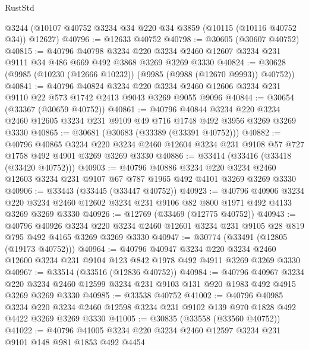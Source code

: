 \begin{lexlean}{RustStd}
\begin{coremodule}
    @3244
    (@10107 @40752 @3234 @34 @220 @34 @3859 (@10115 (@10116 @40752 @34)) @12627)
@40796 := @12633 @40752
@40798 := @30605 (@30607 @40752)
@40815 := @40796
    @40798
    @3234
    @220
    @3234
    @2460
    @12607
    @3234
    @231
    @9111
    @34
    @486
    @669
    @492
    @3868
    @3269
    @3269
    @3330
@40824 := @30628 (@9985 (@10230 (@12666 @10232)) (@9985 (@9988 (@12670 @9993)) @40752))
@40841 := @40796
    @40824
    @3234
    @220
    @3234
    @2460
    @12606
    @3234
    @231
    @9110
    @22
    @573
    @1742
    @2413
    @9043
    @3269
    @9055
    @9096
@40844 := @30654 (@33367 (@30659 @40752))
@40861 := @40796
    @40844
    @3234
    @220
    @3234
    @2460
    @12605
    @3234
    @231
    @9109
    @49
    @716
    @1748
    @492
    @3956
    @3269
    @3269
    @3330
@40865 := @30681 (@30683 (@33389 (@33391 @40752)))
@40882 := @40796
    @40865
    @3234
    @220
    @3234
    @2460
    @12604
    @3234
    @231
    @9108
    @57
    @727
    @1758
    @492
    @4901
    @3269
    @3269
    @3330
@40886 := @33414 (@33416 (@33418 (@33420 @40752)))
@40903 := @40796
    @40886
    @3234
    @220
    @3234
    @2460
    @12603
    @3234
    @231
    @9107
    @67
    @787
    @1965
    @492
    @4101
    @3269
    @3269
    @3330
@40906 := @33443 (@33445 (@33447 @40752))
@40923 := @40796
    @40906
    @3234
    @220
    @3234
    @2460
    @12602
    @3234
    @231
    @9106
    @82
    @800
    @1971
    @492
    @4133
    @3269
    @3269
    @3330
@40926 := @12769 (@33469 (@12775 @40752))
@40943 := @40796
    @40926
    @3234
    @220
    @3234
    @2460
    @12601
    @3234
    @231
    @9105
    @28
    @819
    @795
    @492
    @4165
    @3269
    @3269
    @3330
@40947 := @30774 (@33491 (@12805 (@19173 @40752)))
@40964 := @40796
    @40947
    @3234
    @220
    @3234
    @2460
    @12600
    @3234
    @231
    @9104
    @123
    @842
    @1978
    @492
    @4911
    @3269
    @3269
    @3330
@40967 := @33514 (@33516 (@12836 @40752))
@40984 := @40796
    @40967
    @3234
    @220
    @3234
    @2460
    @12599
    @3234
    @231
    @9103
    @131
    @920
    @1983
    @492
    @4915
    @3269
    @3269
    @3330
@40985 := @33538 @40752
@41002 := @40796
    @40985
    @3234
    @220
    @3234
    @2460
    @12598
    @3234
    @231
    @9102
    @139
    @970
    @1828
    @492
    @4422
    @3269
    @3269
    @3330
@41005 := @30835 (@33558 (@33560 @40752))
@41022 := @40796
    @41005
    @3234
    @220
    @3234
    @2460
    @12597
    @3234
    @231
    @9101
    @148
    @981
    @1853
    @492
    @4454

\end{coremodule}
\end{lexlean}
